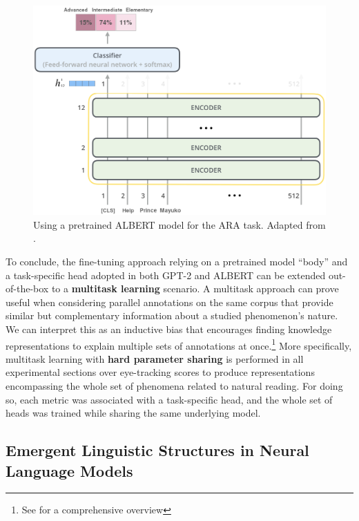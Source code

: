\documentclass[a4paper, nobind]{templates/ociamthesis}
\begin{document}
\begin{figure}

{\centering \includegraphics[width=0.85\linewidth]{figures/2_albert} 

}

\caption{Using a pretrained ALBERT model for the ARA task. Adapted from \textcite{alammar-2018-illustratedbert}.}\label{fig:albert}
\end{figure}

To conclude, the fine-tuning approach relying on a pretrained model ``body'' and a task-specific head adopted in both GPT-2 and ALBERT can be extended out-of-the-box to a \textbf{multitask learning} scenario. A multitask approach can prove useful when considering parallel annotations on the same corpus that provide similar but complementary information about a studied phenomenon's nature. We can interpret this as an inductive bias that encourages finding knowledge representations to explain multiple sets of annotations at once.\footnote{See \textcite{ruder-2017-overview} for a comprehensive overview} More specifically, multitask learning with \textbf{hard parameter sharing} \autocite{caruana-1997-multitask} is performed in all experimental sections over eye-tracking scores to produce representations encompassing the whole set of phenomena related to natural reading. For doing so, each metric was associated with a task-specific head, and the whole set of heads was trained while sharing the same underlying model.

\hypertarget{subsubchap:syntax-nlm}{%
\subsection{Emergent Linguistic Structures in Neural Language Models}\label{subsubchap:syntax-nlm}}
\end{document}
